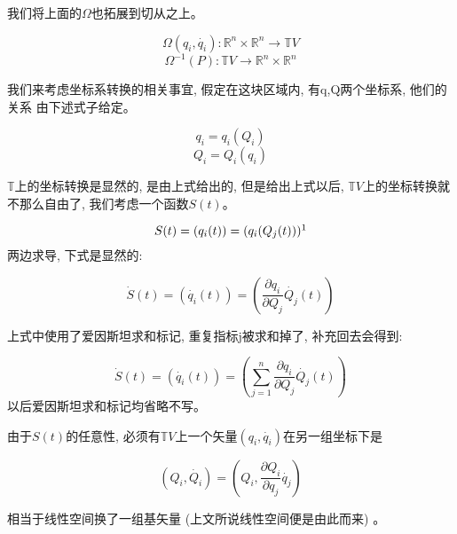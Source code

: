 \documentclass{ctexart}
\numberwithin{equation}{subsection}
\numberwithin{theorem}{subsection}
\numberwithin{definition}{subsection}
\numberwithin{proof}{subsection}
\numberwithin{lemma}{subsection}
\numberwithin{example}{subsection}
\numberwithin{remark}{subsection}
\numberwithin{corollary}{subsection}
\numberwithin{exercise}{subsection}
\numberwithin{problem}{subsection}
\numberwithin{question}{section}
\numberwithin{method}{subsection}
\begin{document}
    我们将上面的$\Omega$也拓展到切从之上。

    \begin{equation}
        \Omega(q_i,\dot{q_i}):\mathbb{R}^n\times\mathbb{R}^n \rightarrow \mathbb{T}V
    \end{equation}
    \begin{equation}
        \Omega^{-1}(P):\mathbb{T}V \rightarrow \mathbb{R}^n\times\mathbb{R}^n
    \end{equation}

    我们来考虑坐标系转换的相关事宜, 假定在这块区域内, 有q,Q两个坐标系, 他们的关系
    由下述式子给定。

    \begin{equation}
        q_i = q_i(Q_i)
    \end{equation}
    \begin{equation}
        Q_i = Q_i(q_i)
    \end{equation}

    $\mathbb{T}$上的坐标转换是显然的, 是由上式给出的, 但是给出上式以后, 
    $\mathbb{T}V$上的坐标转换就不那么自由了, 我们考虑一个函数$S(t)$。

    \begin{equation}
        S(t) = (q_i(t)) = (q_i(Q_j(t)))
        \footnotemark
    \end{equation}
    两边求导, 下式是显然的: 

    \begin{equation}
        \dot{S}(t) = (\dot{q_i}(t)) = (\frac{\partial q_i}{\partial Q_j}\dot{Q_j}(t))
    \end{equation}

    上式中使用了爱因斯坦求和标记, 重复指标j被求和掉了, 补充回去会得到:

    \begin{equation}
        \dot{S}(t) = (\dot{q_i}(t)) = (\sum_{j=1}^n\frac{\partial q_i}{\partial Q_j}\dot{Q_j}(t))
    \end{equation}
    以后爱因斯坦求和标记均省略不写。

    由于$S(t)$的任意性, 必须有$\mathbb{T}V$上一个矢量$(q_i,\dot{q_i})$在另一组坐标下是

    \begin{equation}
        (Q_i,\dot{Q_i}) = (Q_i,\frac{\partial Q_i}{\partial q_j}\dot{q_j})
    \end{equation}

    相当于线性空间换了一组基矢量 (上文所说线性空间便是由此而来) 。

\end{document}
